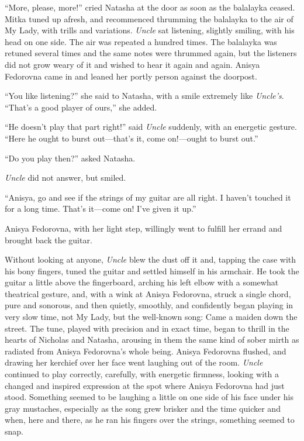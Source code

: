 ``More, please, more!'' cried Natasha at the door as soon as the
balalayka ceased. Mitka tuned up afresh, and recommenced
thrumming the balalayka to the air of My Lady, with trills and
variations. \emph{Uncle} sat listening, slightly smiling, with
his head on one side. The air was repeated a hundred times. The
balalayka was retuned several times and the same notes were
thrummed again, but the listeners did not grow weary of it and
wished to hear it again and again. Anisya Fedorovna came in and
leaned her portly person against the doorpost.

``You like listening?'' she said to Natasha, with a smile
extremely like \emph{Uncle's}. ``That's a good player of ours,''
she added.

``He doesn't play that part right!'' said \emph{Uncle} suddenly,
with an energetic gesture. ``Here he ought to burst out---that's
it, come on!---ought to burst out.''

``Do you play then?'' asked Natasha.

\emph{Uncle} did not answer, but smiled.

``Anisya, go and see if the strings of my guitar are all right. I
haven't touched it for a long time. That's it---come on! I've
given it up.''

Anisya Fedorovna, with her light step, willingly went to fulfill
her errand and brought back the guitar.

Without looking at anyone, \emph{Uncle} blew the dust off it and,
tapping the case with his bony fingers, tuned the guitar and
settled himself in his armchair. He took the guitar a little
above the fingerboard, arching his left elbow with a somewhat
theatrical gesture, and, with a wink at Anisya Fedorovna, struck
a single chord, pure and sonorous, and then quietly, smoothly,
and confidently began playing in very slow time, not My Lady, but
the well-known song: Came a maiden down the street. The tune,
played with precision and in exact time, began to thrill in the
hearts of Nicholas and Natasha, arousing in them the same kind of
sober mirth as radiated from Anisya Fedorovna's whole
being. Anisya Fedorovna flushed, and drawing her kerchief over
her face went laughing out of the room. \emph{Uncle} continued to
play correctly, carefully, with energetic firmness, looking with
a changed and inspired expression at the spot where Anisya
Fedorovna had just stood. Something seemed to be laughing a
little on one side of his face under his gray mustaches,
especially as the song grew brisker and the time quicker and
when, here and there, as he ran his fingers over the strings,
something seemed to snap.

